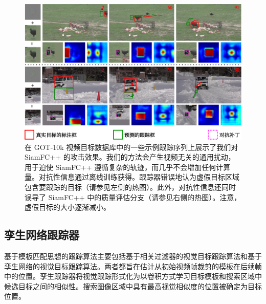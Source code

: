 \begin{figure}[t]
\centering
\includegraphics[width=1.0\textwidth]{Img/attack/1_v8.pdf}
\caption{在 GOT-10k 视频目标数据库中的一些示例跟踪序列上展示了我们对 SiamFC++ 的攻击效果。我们的方法会产生视频无关的通用扰动，用于迫使 SiamFC++ 遵循复杂的轨迹，而几乎不会增加任何计算量。对抗性信息通过离线训练获得。跟踪器错误地认为虚假目标区域包含要跟踪的目标（请参见左侧的热图）。此外，对抗性信息还同时误导了 SiamFC++ 中的质量评估分支（请参见右侧的热图）。注意，虚假目标的大小逐渐减小。} 
\label{fig:1}
\end{figure}

\subsection{孪生网络跟踪器}

基于模板匹配思想的跟踪算法主要包括基于相关过滤器的视觉目标跟踪算法和基于孪生网络的视觉目标跟踪算法。两者都旨在估计从初始视频帧裁剪的模板在后续帧中的位置。孪生跟踪器将视觉跟踪形式化为以卷积方式学习目标模板和搜索区域中候选目标之间的相似性。搜索图像区域中具有最高视觉相似度的位置被确定为目标位置。

